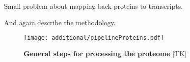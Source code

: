Small problem about mapping back proteins to transcripts.



And again describe the methodology.

  \begin{figure}
      \texttt{[image: additional/pipelineProteins.pdf]}\centering
      \caption[General steps for processing the proteome
      data]{\label{fig:pipelineProt}\textbf{General steps for processing the
      proteome} [TK] }
  \end{figure}



\begin{comment}
They found that almost half of the proteins are expressed in all analysed tissues
(with an enrichment for the metabolism enzymes).
\end{comment}
